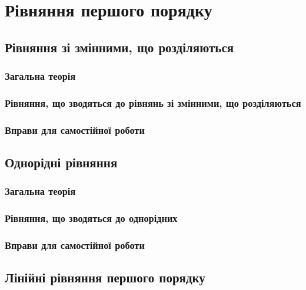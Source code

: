 \section{Рівняння першого порядку}


	\subsection{Рівняння зі змінними, що розділяються}
	

		\subsubsection{Загальна теорія}
		

		\subsubsection{Рівняння, що зводяться до рівнянь зі змінними, що розділяються}
		

		\subsubsection{Вправи для самостійної роботи}
		

	\subsection{Однорідні рівняння}
	

		\subsubsection{Загальна теорія}
		

		\subsubsection{Рівняння, що зводяться до однорідних}
		

		\subsubsection{Вправи для самостійної роботи}
		

	\subsection{Лінійні рівняння першого порядку}
	

